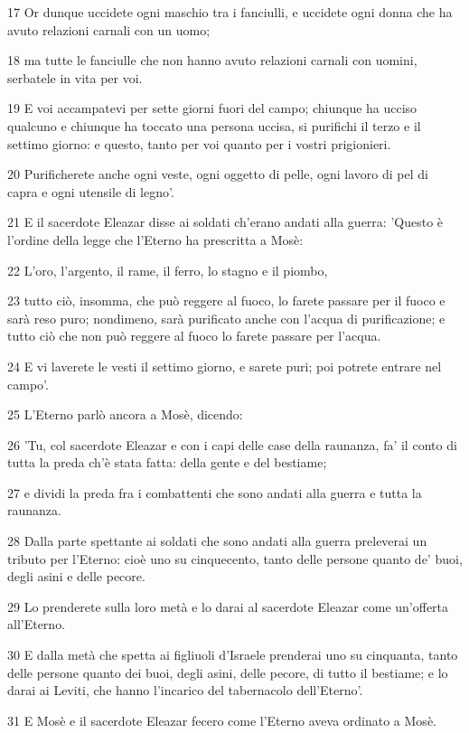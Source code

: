 \par 17 Or dunque uccidete ogni maschio tra i fanciulli, e uccidete ogni donna che ha avuto relazioni carnali con un uomo;
\par 18 ma tutte le fanciulle che non hanno avuto relazioni carnali con uomini, serbatele in vita per voi.
\par 19 E voi accampatevi per sette giorni fuori del campo; chiunque ha ucciso qualcuno e chiunque ha toccato una persona uccisa, si purifichi il terzo e il settimo giorno: e questo, tanto per voi quanto per i vostri prigionieri.
\par 20 Purificherete anche ogni veste, ogni oggetto di pelle, ogni lavoro di pel di capra e ogni utensile di legno'.
\par 21 E il sacerdote Eleazar disse ai soldati ch'erano andati alla guerra: 'Questo è l'ordine della legge che l'Eterno ha prescritta a Mosè:
\par 22 L'oro, l'argento, il rame, il ferro, lo stagno e il piombo,
\par 23 tutto ciò, insomma, che può reggere al fuoco, lo farete passare per il fuoco e sarà reso puro; nondimeno, sarà purificato anche con l'acqua di purificazione; e tutto ciò che non può reggere al fuoco lo farete passare per l'acqua.
\par 24 E vi laverete le vesti il settimo giorno, e sarete puri; poi potrete entrare nel campo'.
\par 25 L'Eterno parlò ancora a Mosè, dicendo:
\par 26 'Tu, col sacerdote Eleazar e con i capi delle case della raunanza, fa' il conto di tutta la preda ch'è stata fatta: della gente e del bestiame;
\par 27 e dividi la preda fra i combattenti che sono andati alla guerra e tutta la raunanza.
\par 28 Dalla parte spettante ai soldati che sono andati alla guerra preleverai un tributo per l'Eterno: cioè uno su cinquecento, tanto delle persone quanto de' buoi, degli asini e delle pecore.
\par 29 Lo prenderete sulla loro metà e lo darai al sacerdote Eleazar come un'offerta all'Eterno.
\par 30 E dalla metà che spetta ai figliuoli d'Israele prenderai uno su cinquanta, tanto delle persone quanto dei buoi, degli asini, delle pecore, di tutto il bestiame; e lo darai ai Leviti, che hanno l'incarico del tabernacolo dell'Eterno'.
\par 31 E Mosè e il sacerdote Eleazar fecero come l'Eterno aveva ordinato a Mosè.
